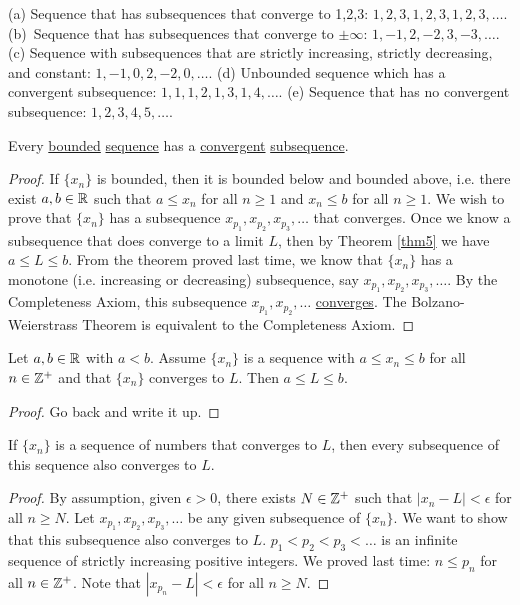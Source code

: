 \documentclass[]{article}
\begin{document}
\begin{example}
	[p.74, \#3] (a) Sequence that has subsequences that converge to 1,2,3: $1,2,3,1,2,3,1,2,3,\dots$.
	(b)~Sequence that has subsequences that converge to $\pm\infty$: $1,-1,2,-2,3,-3,\dots$.
	(c) Sequence with subsequences that are strictly increasing, strictly decreasing, and constant: $1,-1,0,2,-2,0,\dots$.
	(d) Unbounded sequence which has a convergent subsequence: $1,1,1,2,1,3,1,4,\dots$.
	(e) Sequence that has no convergent subsequence: $1,2,3,4,5,\dots$.
\end{example}
\begin{theorem}
	 Every \ul{bounded} \ul{sequence} has a \ul{convergent} \ul{subsequence}.
\end{theorem}
\begin{proof}
	If $\{x_n\}$ is bounded, then it is bounded below and bounded above, i.e. there exist $a,b\in\mathbb{R}$ such that $a\leq x_n$ for all $n\geq 1$ and $x_n\leq b$ for all $n\geq 1$.
	We wish to prove that $\{x_n\}$ has a subsequence $x_{p_1},x_{p_2},x_{p_3},\dots$ that converges. Once we know a subsequence that does converge to a limit $L$, then by Theorem \ref{thm5} we have $a\leq L \leq b$. From the theorem proved last time, we know that \ul{$\{x_n\}$} has a monotone (i.e. increasing or decreasing) subsequence, say $x_{p_1},x_{p_2},x_{p_3},\dots$. By the Completeness Axiom, this subsequence $x_{p_1},x_{p_2},\dots$ \ul{converges}. The Bolzano-Weierstrass Theorem is equivalent to the Completeness Axiom.
\end{proof}
\begin{recall}
	 Let $a,b\in\mathbb{R}$ with $a<b$. Assume $\{x_n\}$ is a sequence with $a\leq x_n \leq b$ for all $n\in\mathbb{Z}^+$ and that \ul{$\{x_n\}$} converges to \ul{$L$}. Then $a\leq L \leq b$.
\end{recall}
\begin{proof}
	Go back and write it up.
\end{proof}
\begin{theorem}
	If $\{x_n\}$ is a sequence of numbers that converges to $L$, then every subsequence of this sequence also converges to $L$.
	\label{thm2-17}
\end{theorem}
\begin{proof}
	By assumption, given $\epsilon>0$, there exists $N\in\mathbb{Z}^+$ such that $|x_n-L|<\epsilon$ for all $n\geq N$. Let $x_{p_1},x_{p_2},x_{p_3},\dots$ be any given subsequence of $\{x_n\}$. We want to show that this subsequence also converges to $L$. $p_1<p_2<p_3<\dots$ is an infinite sequence of strictly increasing positive integers. We proved last time: $n\leq p_n$ for all $n\in\mathbb{Z}^+$.
	Note that $|x_{p_n} - L|<\epsilon$ for all $n\geq N$.
\end{proof}
\end{document}
